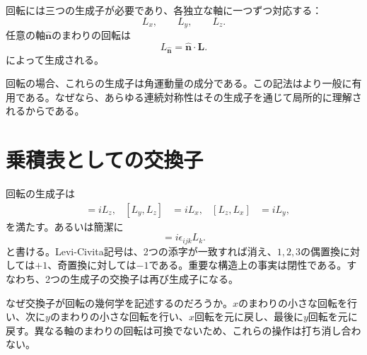 回転には三つの生成子が必要であり、各独立な軸に一つずつ対応する：
\begin{equation}
L_x,\qquad L_y,\qquad L_z.
\end{equation}
任意の軸\(\widehat{\bm n}\)のまわりの回転は
\begin{equation}
L_{\widehat{\bm n}}=\widehat{\bm n}\cdot\bm L.
\end{equation}
によって生成される。

\begin{classroomqa}
\end{classroomqa}

回転の場合、これらの生成子は角運動量の成分である。この記法はより一般に有用である。なぜなら、あらゆる連続対称性はその生成子を通じて局所的に理解されるからである。

\section{乗積表としての交換子}

回転の生成子は
\begin{align}
[L_x,L_y]&=iL_z,&
[L_y,L_z]&=iL_x,&
[L_z,L_x]&=iL_y,
\end{align}
を満たす。あるいは簡潔に
\begin{equation}
[L_i,L_j]=i\epsilon_{ijk}L_k.
\end{equation}
と書ける。Levi-Civita記号は、2つの添字が一致すれば消え、\(1,2,3\)の偶置換に対しては\(+1\)、奇置換に対しては\(-1\)である。重要な構造上の事実は閉性である。すなわち、2つの生成子の交換子は再び生成子になる。

なぜ交換子が回転の幾何学を記述するのだろうか。\(x\)のまわりの小さな回転を行い、次に\(y\)のまわりの小さな回転を行い、\(x\)回転を元に戻し、最後に\(y\)回転を元に戻す。異なる軸のまわりの回転は可換でないため、これらの操作は打ち消し合わない。

\begin{classroomqa}
\end{classroomqa}

